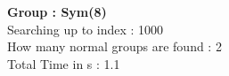 \textbf{Group : Sym(8)}\\
Searching up to index : 1000\\
How many normal groups are found : 2\\
Total Time in s : 1.1\\
